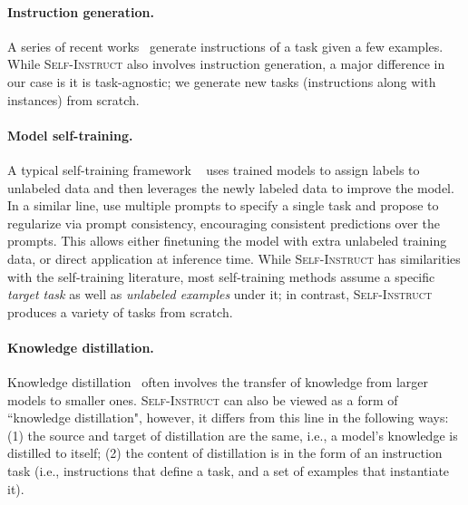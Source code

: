 \documentclass[11pt]{article}
\newcommand{\name}{\textsc{Self-Instruct}}
\begin{document}
\paragraph{Instruction generation.}
A series of recent works~\cite{zhou2022large, ye2022guess, singh2022explaining, honovich2022instruction} generate instructions of a task given a few examples. While \name{} also involves instruction generation, a major difference in our case is it is task-agnostic; we generate new tasks (instructions along with instances) from scratch.

\paragraph{Model self-training.}
A typical self-training framework ~\cite{he2019revisiting, xie2020self, du2021self, amini2022self, huang2022large} uses trained models to assign labels to unlabeled data and then leverages the newly labeled data to improve the model. In a similar line, \citet {zhou2022prompt} use multiple prompts to specify a single task and propose
to regularize via prompt consistency, encouraging
consistent predictions over the
prompts. This allows either 
finetuning the model  with extra unlabeled
training data, or direct application at inference time.
While \name{} has similarities with the self-training literature, most self-training methods assume a specific \textit{target task} as well as \textit{unlabeled examples} under it; in contrast, \name{} produces a variety of tasks from scratch.


\paragraph{Knowledge distillation.}
Knowledge distillation~\cite{hinton2015distilling,Sanh2019DistilBERTAD, west2021symbolic,luciecharlotte2022teachingsmallmodels} often involves the transfer of knowledge from larger models to smaller ones. \name{} can also be viewed as a form of ``knowledge distillation", however, it differs from this line in the following ways: (1) the source and target of distillation are the same, i.e., a model's knowledge is distilled to itself; (2) the content of distillation is in the form of an instruction task (i.e., instructions that define a task, and a set of examples that instantiate it).
\end{document}
